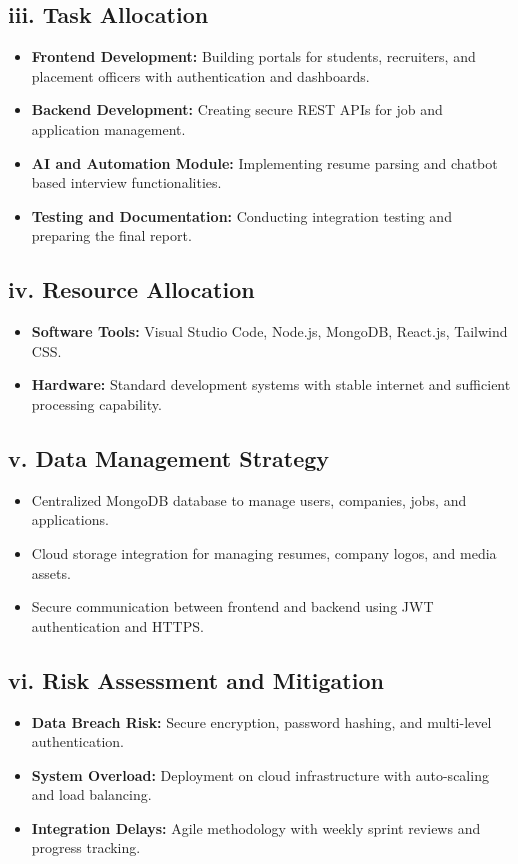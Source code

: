 \documentclass[a4paper, 12pt]{report}
\begin{document}
\subsection*{iii. Task Allocation}
\begin{itemize}[itemsep=-4pt]
    \item \textbf{Frontend Development:} Building portals for students, recruiters, and placement officers with authentication and dashboards.
    \item \textbf{Backend Development:} Creating secure REST APIs for job and application management.
    \item \textbf{AI and Automation Module:} Implementing resume parsing and chatbot based interview functionalities.
    \item \textbf{Testing and Documentation:} Conducting integration testing and preparing the final report.
\end{itemize}

\subsection*{iv. Resource Allocation}
\begin{itemize}[itemsep=-4pt]
    \item \textbf{Software Tools:} Visual Studio Code, Node.js, MongoDB, React.js, Tailwind CSS.
    \item \textbf{Hardware:} Standard development systems with stable internet and sufficient processing capability.
\end{itemize}

\subsection*{v. Data Management Strategy}
\begin{itemize}[itemsep=-4pt]
    \item Centralized MongoDB database to manage users, companies, jobs, and applications.
    \item Cloud storage integration for managing resumes, company logos, and media assets.
    \item Secure communication between frontend and backend using JWT authentication and HTTPS.
\end{itemize}

\subsection*{vi. Risk Assessment and Mitigation}
\begin{itemize}[itemsep=-4pt]
    \item \textbf{Data Breach Risk:} Secure encryption, password hashing, and multi-level authentication.
    \item \textbf{System Overload:} Deployment on cloud infrastructure with auto-scaling and load balancing.
    \item \textbf{Integration Delays:} Agile methodology with weekly sprint reviews and progress tracking.
\end{itemize}
\end{document}
